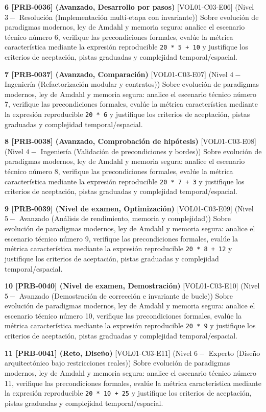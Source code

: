 \documentclass{book}
\begin{document}
\begin{tcolorbox}[title={Ejercicios}, studiumworked, breakable]
\noindent\textbf{6 [PRB-0036] (Avanzado, Desarrollo por pasos)}
[VOL01-C03-E06] (Nivel \(3 -\) Resolución (Implementación multi-etapa con invariante)) Sobre evolución de paradigmas modernos, ley de Amdahl y memoria segura: analice el escenario técnico número 6, verifique las precondiciones formales, evalúe la métrica característica mediante la expresión reproducible \texttt{20 * 5 + 10} y justifique los criterios de aceptación, pistas graduadas y complejidad temporal/espacial.

\noindent\textbf{7 [PRB-0037] (Avanzado, Comparación)}
[VOL01-C03-E07] (Nivel \(4 -\) Ingeniería (Refactorización modular y contratos)) Sobre evolución de paradigmas modernos, ley de Amdahl y memoria segura: analice el escenario técnico número 7, verifique las precondiciones formales, evalúe la métrica característica mediante la expresión reproducible \texttt{20 * 6} y justifique los criterios de aceptación, pistas graduadas y complejidad temporal/espacial.

\noindent\textbf{8 [PRB-0038] (Avanzado, Comprobación de hipótesis)}
[VOL01-C03-E08] (Nivel \(4 -\) Ingeniería (Validación de precondiciones y bordes)) Sobre evolución de paradigmas modernos, ley de Amdahl y memoria segura: analice el escenario técnico número 8, verifique las precondiciones formales, evalúe la métrica característica mediante la expresión reproducible \texttt{20 * 7 + 3} y justifique los criterios de aceptación, pistas graduadas y complejidad temporal/espacial.

\noindent\textbf{9 [PRB-0039] (Nivel de examen, Optimización)}
[VOL01-C03-E09] (Nivel \(5 -\) Avanzado (Análisis de rendimiento, memoria y complejidad)) Sobre evolución de paradigmas modernos, ley de Amdahl y memoria segura: analice el escenario técnico número 9, verifique las precondiciones formales, evalúe la métrica característica mediante la expresión reproducible \texttt{20 * 8 + 12} y justifique los criterios de aceptación, pistas graduadas y complejidad temporal/espacial.

\noindent\textbf{10 [PRB-0040] (Nivel de examen, Demostración)}
[VOL01-C03-E10] (Nivel \(5 -\) Avanzado (Demostración de corrección e invariante de bucle)) Sobre evolución de paradigmas modernos, ley de Amdahl y memoria segura: analice el escenario técnico número 10, verifique las precondiciones formales, evalúe la métrica característica mediante la expresión reproducible \texttt{20 * 9} y justifique los criterios de aceptación, pistas graduadas y complejidad temporal/espacial.

\noindent\textbf{11 [PRB-0041] (Reto, Diseño)}
[VOL01-C03-E11] (Nivel \(6 -\) Experto (Diseño arquitectónico bajo restricciones reales)) Sobre evolución de paradigmas modernos, ley de Amdahl y memoria segura: analice el escenario técnico número 11, verifique las precondiciones formales, evalúe la métrica característica mediante la expresión reproducible \texttt{20 * 10 + 25} y justifique los criterios de aceptación, pistas graduadas y complejidad temporal/espacial.


\end{tcolorbox}
\end{document}
